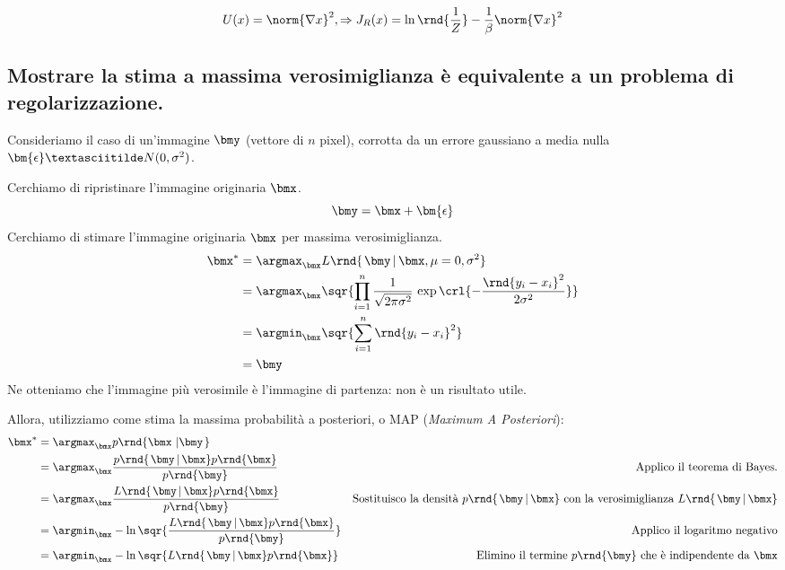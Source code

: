 \documentclass[\main/main.tex]{subfiles}
\newcommand{\gauss}[3]{\frac{1}{\sqrt{2\pi #3}}\,\exp\crl{-\frac{\rnd{#1-#2}^2}{2 #3}}}
\begin{document}
\[
	U(x)=\norm{\nabla x}^2, \Rightarrow J_R(x) = \ln\rnd{\frac{1}{Z}}-\frac{1}{\beta}\norm{\nabla x}^2
\]

\subsection{Mostrare la stima a massima verosimiglianza è equivalente a un problema di regolarizzazione.}

Consideriamo il caso di un'immagine $\bmy$ (vettore di $n$ pixel), corrotta da un errore gaussiano a media nulla $\bm{\epsilon} \textasciitilde N(0,\sigma^2)$.

Cerchiamo di ripristinare l'immagine originaria $\bmx$.
\[
	\bmy=\bmx+\bm{\epsilon}
\]
Cerchiamo di stimare l'immagine originaria $\bmx$ per massima verosimiglianza.
\begin{align*}
	\bmx^* & = \argmax_{\bmx} L\rnd{\left.\bmy\,\right\rvert\bmx,\mu=0,\sigma^2} \\
	       & = \argmax_{\bmx} \sqr{ \prod_{i=1}^{n} \gauss{y_i}{x_i}{\sigma^2} } \\
	       & = \argmin_{\bmx} \sqr{ \sum_{i=1}^{n}\rnd{y_i-x_i}^2 }              \\
	       & = \bmy
\end{align*}
Ne otteniamo che l'immagine più verosimile è l'immagine di partenza: non è un risultato utile.

Allora, utilizziamo come stima la massima probabilità a posteriori, o MAP (\textit{Maximum A Posteriori}):
\begin{align*}
	\bmx^* & = \argmax_{\bmx} p\rnd{\bmx\,\left\rvert\bmy\right.}                                                                                                                                                                              \\
	       & = \argmax_{\bmx} \frac{p\rnd{\left.\bmy\,\right\rvert\bmx}p\rnd{\bmx}}{p\rnd{\bmy}}            & \text{Applico il teorema di Bayes.}                                                                                              \\
	       & = \argmax_{\bmx} \frac{L\rnd{\left.\bmy\,\right\rvert\bmx}p\rnd{\bmx}}{p\rnd{\bmy}}            & \text{Sostituisco la densità $p\rnd{\left.\bmy\,\right\rvert\bmx}$ con la verosimiglianza $L\rnd{\left.\bmy\,\right\rvert\bmx}$} \\
	       & = \argmin_{\bmx} -\ln\sqr{ \frac{L\rnd{\left.\bmy\,\right\rvert\bmx}p\rnd{\bmx}}{p\rnd{\bmy}}} & \text{Applico il logaritmo negativo}                                                                                             \\
	       & =\argmin_{\bmx} -\ln\sqr{L\rnd{\left.\bmy\,\right\rvert\bmx}p\rnd{\bmx}}                       & \text{Elimino il termine $p\rnd{\bmy}$ che è indipendente da $\bmx$}
\end{align*}
\end{document}
